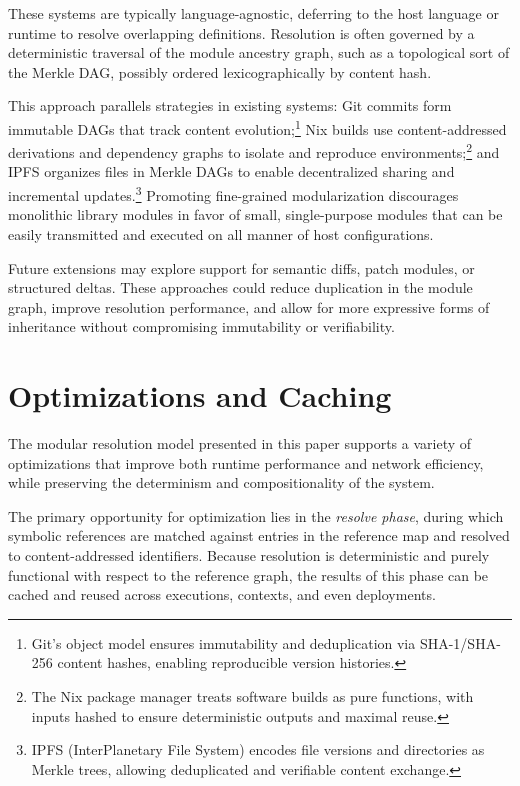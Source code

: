 \documentclass[sigplan,screen]{acmart}
\begin{document}
\newpage
These systems are typically language-agnostic, deferring to the host language or runtime to resolve overlapping definitions. Resolution is often governed by a deterministic traversal of the module ancestry graph, such as a topological sort of the Merkle DAG, possibly ordered lexicographically by content hash.

This approach parallels strategies in existing systems: Git commits form immutable DAGs that track content evolution;\footnote{Git's object model ensures immutability and deduplication via SHA-1/SHA-256 content hashes, enabling reproducible version histories.} Nix builds use content-addressed derivations and dependency graphs to isolate and reproduce environments;\footnote{The Nix package manager treats software builds as pure functions, with inputs hashed to ensure deterministic outputs and maximal reuse.} and IPFS organizes files in Merkle DAGs to enable decentralized sharing and incremental updates.\footnote{IPFS (InterPlanetary File System) encodes file versions and directories as Merkle trees, allowing deduplicated and verifiable content exchange.} Promoting fine-grained modularization discourages monolithic library modules in favor of small, single-purpose modules that can be easily transmitted and executed on all manner of host configurations.

Future extensions may explore support for semantic diffs, patch modules, or structured deltas. These approaches could reduce duplication in the module graph, improve resolution performance, and allow for more expressive forms of inheritance without compromising immutability or verifiability.

\section{Optimizations and Caching}
\label{sec:optimizations}

The modular resolution model presented in this paper supports a variety of optimizations that improve both runtime performance and network efficiency, while preserving the determinism and compositionality of the system.

The primary opportunity for optimization lies in the \textit{resolve phase}, during which symbolic references are matched against entries in the reference map and resolved to content-addressed identifiers. Because resolution is deterministic and purely functional with respect to the reference graph, the results of this phase can be cached and reused across executions, contexts, and even deployments.
\end{document}
